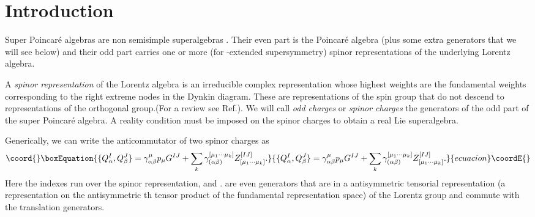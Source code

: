 \documentclass[a4paper,12pt]{article}
\begin{document}
\begin{abstract}
We consider simple superalgebras which are a supersymmetric
extension of the spin algebra in the cases where the number of odd
generators does not exceed 64. All of them contain a super
Poincar\'e algebra as a contraction  and another as  a subalgebra.
Because of the contraction property, some of these algebras can be
interpreted as de Sitter or  anti de Sitter superalgebras.
However, the number of odd generators present in the contraction
is not always minimal due to the different splitting properties of
the spinor representations under a subalgebra.  We consider the
general case, with arbitrary dimension and signature, and examine
in detail particular  examples with physical implications in
dimensions \coordHE{} and \coordHE{}.
\end{abstract}

\vfill\eject

\section{Introduction}



Super Poincar\'e algebras \cite{wz} are non semisimple
superalgebras  \cite{nrs,ka,bg}.  Their even part is the
Poincar\'e algebra (plus some extra generators that we will see
below) and their odd part carries one   or more (for \coordHE{}-extended
supersymmetry) spinor representations of the underlying Lorentz
algebra.

 A {\it spinor representation} of the Lorentz algebra is
an irreducible complex representation whose highest weights are
the fundamental weights corresponding to the right extreme nodes
in the Dynkin diagram. These are representations of the spin group
that do not descend to representations of the orthogonal
group.(For a review see Ref.\cite{st,ca}).
 We will call
{\it odd charges} or {\it spinor charges} the generators of the
odd part of the super Poincar\'e algebra. A reality condition must
be imposed on the spinor charges to obtain a real Lie
superalgebra.

Generically, we can write the anticommutator  of two spinor
charges as
\begin{equation}\coord{}\boxEquation{\{Q^I_\alpha,Q^J_\beta\}=\gamma^\mu_{\alpha\beta}p_\mu G^{IJ}
 +\sum\limits_{k} \gamma^{[\mu_1\cdots
\mu_k]}_{(\alpha \beta)}Z^{[IJ]}_{[\mu_1\cdots \mu_k]}.
\label{ccharges}}{\{Q^I_\alpha,Q^J_\beta\}=\gamma^\mu_{\alpha\beta}p_\mu G^{IJ}
 +\sum\limits_{k} \gamma^{[\mu_1\cdots
\mu_k]}_{(\alpha \beta)}Z^{[IJ]}_{[\mu_1\cdots \mu_k]}.
}{ecuacion}\coordE{}\end{equation}  Here the indexes \myHighlight{$\alpha$}\coordHE{} run over
the spinor representation, and \coordHE{}.
\coordHE{} are even generators that are in a
antisymmetric tensorial representation (a representation on the
antisymmetric \coordHE{}th tensor product of the fundamental
representation space) of the Lorentz group and commute with the
translation generators.
\end{document}
